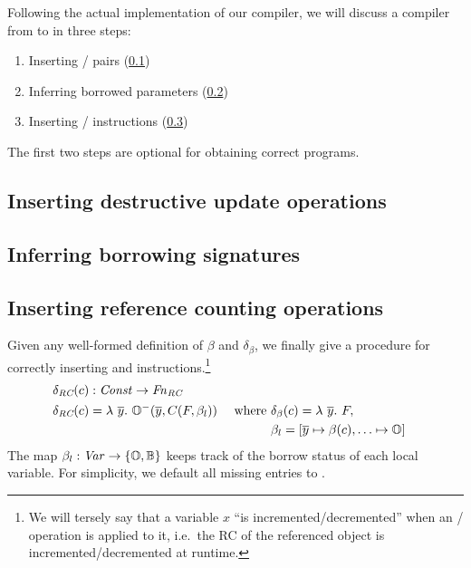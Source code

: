 \documentclass[sigconf]{acmart}
\begin{document}
Following the actual implementation of our compiler, we will discuss a %
compiler from \pureIR{} to \rcIR{} in three steps:

\begin{enumerate}
\item Inserting / pairs (\cref{sec:update})
\item Inferring borrowed parameters (\cref{sec:borrowinf})
\item Inserting / instructions (\cref{sec:incdec})
\end{enumerate}

The first two steps are optional for obtaining correct \rcIR{} programs.

\subsection{Inserting destructive update operations}
\label{sec:update}



\subsection{Inferring borrowing signatures}
\label{sec:borrowinf}



\subsection{Inserting reference counting operations}
\label{sec:incdec}

Given any well-formed definition of $\beta$ and $\delta_\beta$, we
finally give a procedure for correctly inserting  and 
instructions.\footnote{We will tersely say that a variable $x$ ``is incremented/decremented'' when an /
  operation is applied to it, i.e.\ the RC of the referenced object is incremented/decremented at runtime.}
\begin{align*}
  \delta_{\textit{RC}}(c) &: \mathit{Const} \rightarrow \mathit{Fn}_{\textit{RC}} \\
  \delta_{\textit{RC}}(c) &= \lambda\ \overline{y}.\ \mathbb{O}{}^-(\overline{y}, C(F, \beta_l)) &&\text{ where } \hspace{-1em}&&\delta_\beta(c) = \lambda\ \overline{y}.\ F, \\
  &&&&&\beta_l = [\overline{y} \mapsto \beta(c), \ldots \mapsto \mathbb{O}{}]
\end{align*}
The map $\beta_l : \mathit{Var} \rightarrow \{\mathbb{O}{}, \mathbb{B}{}\}$
keeps track of the borrow status of each local variable. For simplicity, we default all missing entries to \own{}.
\end{document}
